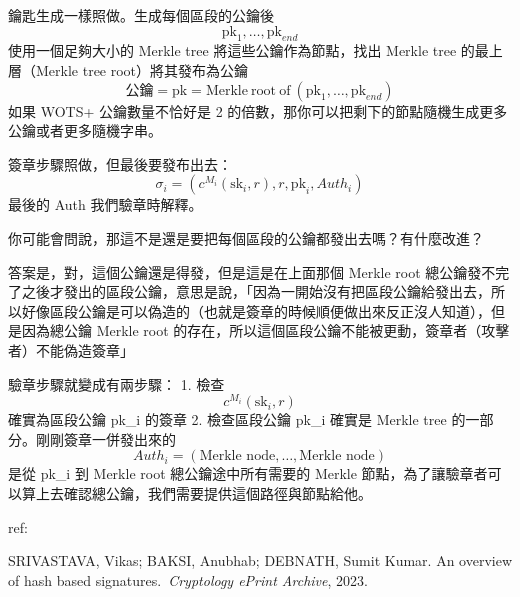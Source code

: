 \documentclass[
]{article}
\begin{document}
鑰匙生成一樣照做。生成每個區段的公鑰後 \[
\mathrm{pk}_{1},\dots,\mathrm{pk}_{end}
\] 使用一個足夠大小的 Merkle tree 將這些公鑰作為節點，找出 Merkle tree
的最上層（Merkle tree root）將其發布為公鑰 \[
公鑰  = \mathrm{pk} = \mathrm{Merkle\  root\ of\ }(\mathrm{pk}_{1},\dots,\mathrm{pk}_{end})
\] 如果 WOTS+ 公鑰數量不恰好是 2
的倍數，那你可以把剩下的節點隨機生成更多公鑰或者更多隨機字串。

簽章步驟照做，但最後要發布出去： \[
\sigma_{i} = (c^{M_{i}}(\mathrm{sk}_{i},r), r, \mathrm{pk}_{i}, Auth_{i})
\] 最後的 Auth 我們驗章時解釋。

你可能會問說，那這不是還是要把每個區段的公鑰都發出去嗎？有什麼改進？

答案是，對，這個公鑰還是得發，但是這是在上面那個 Merkle root
總公鑰發不完了之後才發出的區段公鑰，意思是說，「因為一開始沒有把區段公鑰給發出去，所以好像區段公鑰是可以偽造的（也就是簽章的時候順便做出來反正沒人知道），但是因為總公鑰
Merkle root
的存在，所以這個區段公鑰不能被更動，簽章者（攻擊者）不能偽造簽章」

驗章步驟就變成有兩步驟： 1. 檢查 \[
c^{M_{i}}(\mathrm{sk}_{i},r) 
\] 確實為區段公鑰 pk\_i 的簽章 2. 檢查區段公鑰 pk\_i 確實是 Merkle tree
的一部分。剛剛簽章一併發出來的 \[
Auth_{i} = (\text{Merkle node},\dots,\text{Merkle node})
\] 是從 pk\_i 到 Merkle root 總公鑰途中所有需要的 Merkle
節點，為了讓驗章者可以算上去確認總公鑰，我們需要提供這個路徑與節點給他。

ref:

SRIVASTAVA, Vikas; BAKSI, Anubhab; DEBNATH, Sumit Kumar. An overview of
hash based signatures.~\emph{Cryptology ePrint Archive}, 2023.
\end{document}
